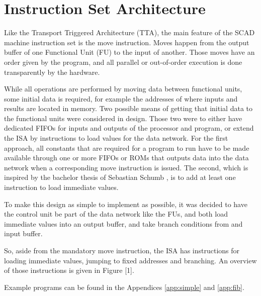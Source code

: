 	\section{Instruction Set Architecture}
		Like the Transport Triggered Architecture (TTA), the main feature of the SCAD machine instruction set is the move instruction.
		Moves happen from the output buffer of one Functional Unit (FU) to the input of another.
		Those moves have an order given by the program, and all parallel or out-of-order execution is done transparently by the hardware.
		
		While all operations are performed by moving data between functional units, some initial data is required, for example the addresses of where inputs and results are located in memory.
		Two possible means of getting that initial data to the functional units were considered in design.
		Those two were to either have dedicated FIFOs for inputs and outputs of the processor and program, or extend the ISA by instructions to load values for the data network.
		For the first approach, all constants that are required for a program to run have to be made available through one or more FIFOs or ROMs that outputs data into the data network when a corresponding move instruction is issued.
		The second, which is inspired by the bachelor thesis of Sebastian Schumb \cite{Schu15}, is to add at least one instruction to load immediate values.
		
		To make this design as simple to implement as possible, it was decided to have the control unit be part of the data network like the FUs, and both load immediate values into an output buffer, and take branch conditions from and input buffer. %
		
		So, aside from the mandatory move instruction, the ISA has instructions for loading immediate values, jumping to fixed addresses and branching.
		An overview of those instructions is given in Figure [1].%
		
		Example programs can be found in the Appendices \ref{app:simple} and \ref{app:fib}.
		
